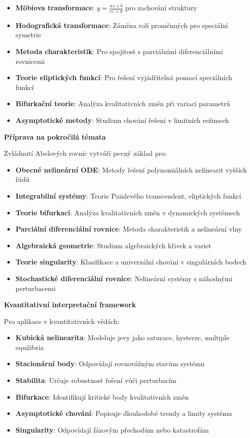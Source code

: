 \begin{itemize}
\item \textbf{Möbiova transformace}: $y = \frac{az + b}{cz + d}$ pro zachování struktury
\item \textbf{Hodografická transformace}: Záměna rolí proměnných pro speciální symetrie
\item \textbf{Metoda charakteristik}: Pro spojitost s parciálními diferenciálními rovnicemi
\item \textbf{Teorie eliptických funkcí}: Pro řešení vyjádřitelná pomocí speciálních funkcí
\item \textbf{Bifurkační teorie}: Analýza kvalitativních změn při variaci parametrů
\item \textbf{Asymptotické metody}: Studium chování řešení v limitních režimech
\end{itemize}

\vspace{1\baselineskip}

\noindent\textbf{Příprava na pokročilá témata}

Zvládnutí Abelových rovnic vytváří pevný základ pro:
\begin{itemize}
\item \textbf{Obecné nelineární ODE}: Metody řešení polynomiálních nelinearit vyšších řádů
\item \textbf{Integrabilní systémy}: Teorie Painlevého transcendent, eliptických funkcí
\item \textbf{Teorie bifurkací}: Analýza kvalitativních změn v dynamických systémech
\item \textbf{Parciální diferenciální rovnice}: Metoda charakteristik a nelineární vlny
\item \textbf{Algebraická geometrie}: Studium algebraických křivek a variet
\item \textbf{Teorie singularity}: Klasifikace a univerzální chování v singulárních bodech
\item \textbf{Stochastické diferenciální rovnice}: Nelineární systémy s náhodnými perturbacemi
\end{itemize}

\vspace{1\baselineskip}

\noindent\textbf{Kvantitativní interpretační framework}

Pro aplikace v kvantitativních vědách:
\begin{itemize}
\item \textbf{Kubická nelinearita}: Modeluje jevy jako saturace, hysterze, multiple equilibria
\item \textbf{Stacionární body}: Odpovídají rovnovážným stavům systému
\item \textbf{Stabilita}: Určuje robustnost řešení vůči perturbacím
\item \textbf{Bifurkace}: Identifikují kritické body kvalitativních změn
\item \textbf{Asymptotické chování}: Popisuje dlouhodobé trendy a limity systému
\item \textbf{Singularity}: Odpovídají fázovým přechodům nebo katastrofám
\end{itemize}

